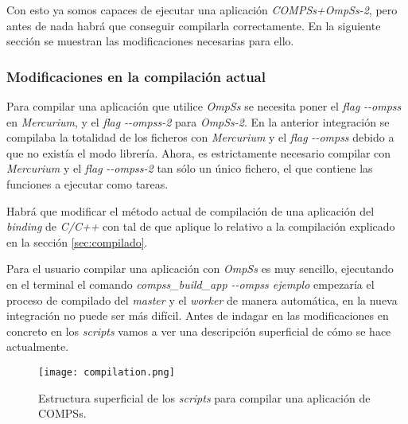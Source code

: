 Con esto ya somos capaces de ejecutar una aplicación \textit{COMPSs+OmpSs-2}, pero antes de nada habrá que conseguir compilarla correctamente. En la siguiente sección se muestran las modificaciones necesarias para ello.

\subsubsection{Modificaciones en la compilación actual}
\label{sec:modificacioncompilacion}

Para compilar una aplicación que utilice \textit{OmpSs} se necesita poner el \textit{flag} \textit{-{}-ompss} en \textit{Mercurium}, y el \textit{flag} \textit{-{}-ompss-2} para \textit{OmpSs-2}. En la anterior integración se compilaba la totalidad de los ficheros con \textit{Mercurium} y el \textit{flag} \textit{-{}-ompss} debido a que no existía el modo librería. Ahora, es estrictamente necesario compilar con \textit{Mercurium} y el \textit{flag} \textit{-{}-ompss-2} tan sólo un único fichero, el que contiene las funciones a ejecutar como tareas. 
\par\bigskip
Habrá que modificar el método actual de compilación de una aplicación del \textit{binding} de \textit{C/C++} con tal de que aplique lo relativo a la compilación explicado en la sección \ref{sec:compilado}.
\par\bigskip

Para el usuario compilar una aplicación con \textit{OmpSs} es muy sencillo, ejecutando en el terminal el comando \textit{compss\_build\_app -{}-ompss ejemplo} empezaría el proceso de compilado del \textit{master} y el \textit{worker} de manera automática, en la nueva integración no puede ser más difícil. Antes de indagar en las modificaciones en concreto en los \textit{scripts} vamos a ver una descripción superficial de cómo se hace actualmente.

\begin{figure}[H]
    \centering 
    \caption{Estructura superficial de los \textit{scripts} para compilar una aplicación de COMPSs.}
    \texttt{[image: compilation.png]}
    \label{fig:compilado}
\end{figure}

